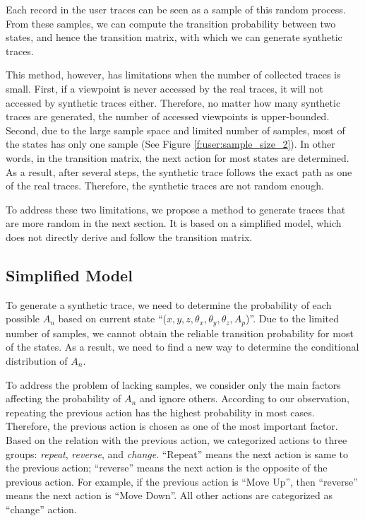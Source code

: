 Each record in the user traces can be seen as a sample of this random process.
From these samples, we can compute the transition probability between two states, and hence
the transition matrix, with which we can generate synthetic traces.

This method, however, has limitations when the number of collected traces is small. First, if a viewpoint is 
never accessed by the real traces, it will not accessed by synthetic traces either. Therefore, no matter how
many synthetic traces are generated, the number of accessed viewpoints is upper-bounded. 
Second, due to the large sample space and limited number of samples, most of the states has only one sample
(See Figure \ref{f:user:sample_size_2}). 
In other words, in the transition matrix, the next action for most states are determined. 
As a result, after several steps, the synthetic trace follows the exact path as one of the real traces. Therefore, the synthetic traces are not random enough.

To address these two limitations, we propose a method to generate traces that are more random in the next section.
It is based on a simplified model, which does not directly derive and follow the transition matrix.

\subsection{Simplified Model}
To generate a synthetic trace, we need to determine the probability of each possible $A_n$ based on current
state ``($x,y,z,\theta_x,\theta_y,\theta_z,A_p$)''. Due to the limited number of samples, we cannot obtain the reliable
transition probability for most of the states. As a result, we need to find a new way to determine the 
conditional distribution of $A_n$.

To address the problem of lacking samples, we consider only the main factors 
affecting the probability of $A_n$ and ignore others. 
According to our observation, 
repeating the previous action has the highest probability in most cases. 
Therefore, the previous action is chosen as one of the most important factor. 
Based on the relation with the previous action, we categorized actions to three groups: 
\textit{repeat}, \textit{reverse}, and \textit{change}. 
``Repeat'' means the next action is same to the previous action; ``reverse'' means
the next action is the opposite of the previous action. For example, if the previous action
is ``Move Up'', then ``reverse'' means the next action is ``Move Down''. All other actions are 
categorized as ``change'' action.

